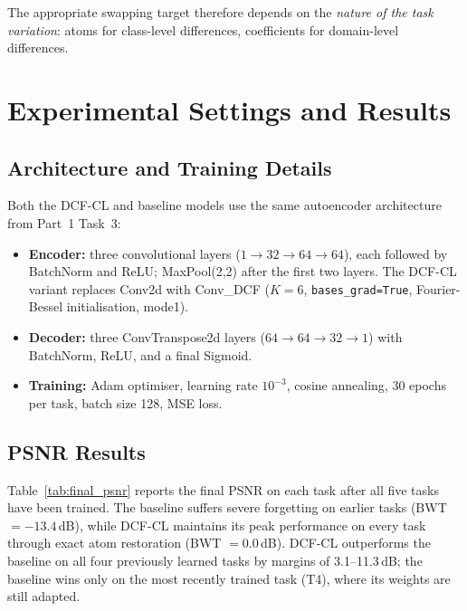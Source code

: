 \documentclass[11pt,letterpaper]{article}
\begin{document}
The appropriate swapping target therefore depends on the \emph{nature of the
task variation}: atoms for class-level differences, coefficients for
domain-level differences.

\section{Experimental Settings and Results}
\label{sec:results}

\subsection{Architecture and Training Details}

Both the DCF-CL and baseline models use the same autoencoder architecture
from Part~1 Task~3:

\begin{itemize}[leftmargin=*]
  \item \textbf{Encoder:} three convolutional layers
    ($1 \to 32 \to 64 \to 64$), each followed by BatchNorm and ReLU;
    MaxPool(2,2) after the first two layers.  The DCF-CL variant replaces
    Conv2d with Conv\_DCF ($K = 6$, \texttt{bases\_grad=True},
    Fourier-Bessel initialisation, mode1).
  \item \textbf{Decoder:} three ConvTranspose2d layers
    ($64 \to 64 \to 32 \to 1$) with BatchNorm, ReLU, and a final Sigmoid.
  \item \textbf{Training:} Adam optimiser, learning rate $10^{-3}$, cosine
    annealing, 30 epochs per task, batch size 128, MSE loss.
\end{itemize}

\subsection{PSNR Results}

Table~\ref{tab:final_psnr} reports the final PSNR on each task after all
five tasks have been trained.  The baseline suffers severe forgetting on
earlier tasks (BWT $= -13.4$\,dB), while DCF-CL maintains its peak
performance on every task through exact atom restoration (BWT $= 0.0$\,dB).
DCF-CL outperforms the baseline on all four previously learned tasks by
margins of 3.1--11.3\,dB; the baseline wins only on the most recently
trained task (T4), where its weights are still adapted.
\end{document}
